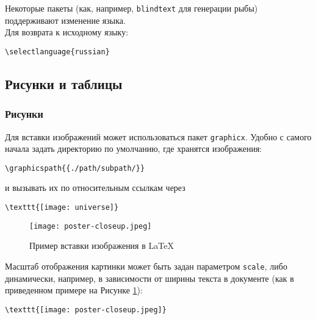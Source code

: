 \documentclass[a4paper]{article}
\begin{document}
Некоторые пакеты (как, например, \lstinline{blindtext} для генерации рыбы) поддерживают изменение языка.\\
Для возврата к исходному языку: 
\begin{lstlisting}
\selectlanguage{russian} 
\end{lstlisting}
\thispagestyle{empty}
\newpage
\subsection{Рисунки и таблицы}
\subsubsection{Рисунки}
Для вставки изображений может использоваться пакет \lstinline{graphicx}.
Удобно с самого начала задать директорию по умолчанию, где хранятся изображения:
\begin{lstlisting} 
\graphicspath{{./path/subpath/}} 
\end{lstlisting}
и вызывать их по относительным ссылкам через
\begin{lstlisting} 
\texttt{[image: universe]}
\end{lstlisting} 
\begin{figure}[h]
	\centering
	\texttt{[image: poster-closeup.jpeg]}
	\caption{Пример вставки изображения в \LaTeX}
	\label{fig:mesh1}
\end{figure}

Масштаб отображения картинки может быть задан параметром \lstinline{scale}, либо динамически, например, в зависимости от ширины текста в документе (как в приведенном примере на Рисунке \ref{fig:mesh1}): \begin{lstlisting} 
\texttt{[image: poster-closeup.jpeg]}
\end{lstlisting}
\thispagestyle{empty}
\newpage
\end{document}
